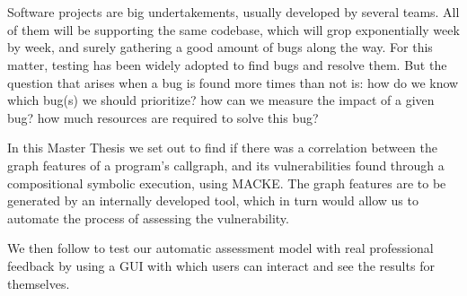 \chapter{\abstractname}

Software projects are big undertakements, usually developed by several teams. All of them will be supporting the same codebase, which will grop exponentially week by week, and surely gathering a good amount of bugs along the way.
For this matter, testing has been widely adopted to find bugs and resolve them. But the question that arises when a bug is found more times than not is: how do we know which bug(s) we should prioritize? how can we measure the impact of a given bug? how much resources are required to solve this bug?

In this Master Thesis we set out to find if there was a correlation between the graph features of a program's callgraph, and its vulnerabilities found through a compositional symbolic execution, using MACKE. The graph features are to be generated by an internally developed tool, which in turn would allow us to automate the process of assessing the vulnerability.

We then follow to test our automatic assessment model with real professional feedback by using a GUI with which users can interact and see the results for themselves. 